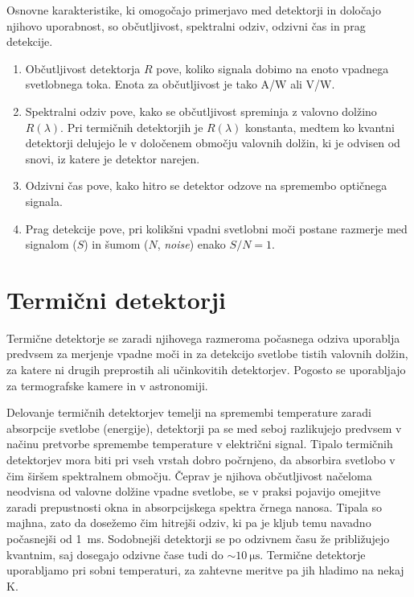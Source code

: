 Osnovne karakteristike, ki omogočajo primerjavo med detektorji in določajo njihovo uporabnost,
so občutljivost, spektralni odziv, odzivni čas in prag detekcije. 

\begin{enumerate}
\item Občutljivost detektorja $R$ pove, koliko signala dobimo na enoto vpadnega svetlobnega toka. 
Enota za občutljivost je tako A/W ali V/W. 
\item Spektralni odziv pove, kako se občutljivost spreminja z valovno dolžino $R(\lambda)$.
Pri termičnih detektorjih je $R(\lambda)$ konstanta, medtem ko kvantni detektorji 
delujejo le v določenem območju valovnih dolžin, ki je odvisen od snovi, 
iz katere je detektor narejen. 
\item Odzivni čas pove, kako hitro se detektor odzove na spremembo optičnega signala. 
\item Prag detekcije pove, pri kolikšni vpadni svetlobni moči postane razmerje med signalom ($S$)
in šumom ($N$, {\it noise}) enako $S/N = 1$. 
\end{enumerate}

\section{Termični detektorji}
Termične detektorje se zaradi njihovega razmeroma počasnega odziva uporablja predvsem 
za merjenje vpadne moči in za detekcijo svetlobe tistih valovnih dolžin, za katere 
ni drugih preprostih ali učinkovitih detektorjev. Pogosto se uporabljajo za termografske 
kamere in v astronomiji.

Delovanje termičnih detektorjev temelji na spremembi temperature zaradi absorpcije svetlobe 
(energije), detektorji pa se med seboj razlikujejo predvsem v načinu pretvorbe spremembe 
temperature v električni signal.
Tipalo termičnih detektorjev mora biti pri vseh vrstah dobro počrnjeno, da absorbira
svetlobo v čim širšem spektralnem območju. Čeprav je njihova občutljivost načeloma 
neodvisna od valovne dolžine vpadne svetlobe, se v praksi pojavijo omejitve zaradi
prepustnosti okna in absorpcijskega spektra črnega nanosa. Tipala so majhna, zato 
da dosežemo čim hitrejši odziv, ki pa je kljub temu navadno počasnejši od 1~ms. Sodobnejši
detektorji se po odzivnem času že približujejo kvantnim, saj dosegajo odzivne čase tudi do
$\sim 10~\si{\micro\second}$. Termične detektorje uporabljamo pri sobni temperaturi, 
za zahtevne meritve pa jih hladimo na nekaj K. 

